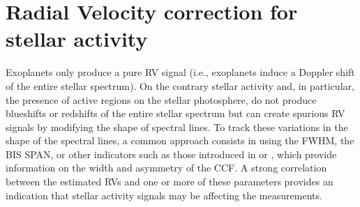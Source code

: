 \documentclass{aa}
\begin{document}
\section{Radial Velocity correction for stellar activity} \label{sec:31}

Exoplanets only produce a pure RV signal (i.e., exoplanets induce a Doppler shift of the entire stellar spectrum). On the contrary stellar activity and, in particular, the presence of active regions on the stellar photosphere, do not produce blueshifts or redshifts of the entire stellar spectrum but can create spurious RV signals by modifying the shape of spectral lines.
To track these variations in the shape of the spectral lines, a common approach consists in using the FWHM, the BIS SPAN, or other indicators such as those introduced in \citet{Boisse-2011} or \citet{Figueira-2013}, which provide information on the width and asymmetry of the CCF. A strong correlation between the estimated RVs and one or more of these parameters provides an indication that stellar activity signals may be affecting the measurements.
\end{document}
